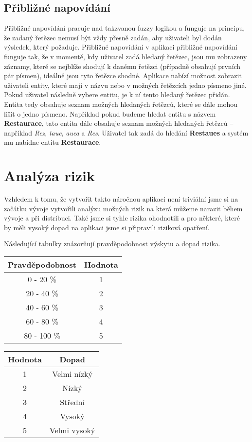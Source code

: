 \subsection{Přibližné napovídání}
\par Přibližné napovídání pracuje nad takzvanou fuzzy logikou a funguje na principu, že zadaný řetězec nemusí být vždy přesně zadán, aby uživateli byl dodán výsledek, který požaduje. Přibližné napovídání v aplikaci přibližné napovídání funguje tak, že v momentě, kdy uživatel zadá hledaný řetězec, jsou mu zobrazeny záznamy, které se nejblíže shodují k danému řetězci (případně obsahují prvních pár písmen), ideálně jsou tyto řetězce shodné. Aplikace nabízí možnost zobrazit uživateli entity, které mají v názvu nebo v možných řetězcích jedno písmeno jiné. Pokud uživatel následně vybere entitu, je k ní tento hledaný řetězec přidán. Entita tedy obsahuje seznam možných hledaných řetězců, které se dále mohou lišit o jedno písmeno. Například pokud budeme hledat entitu s názvem \textbf{Restaurace}, tato entita dále obsahuje seznam možných hledaných řetězců -- například \textit{Rez}, \textit{taue}, \textit{auea} a \textit{Res}. Uživatel tak zadá do hledání \textbf{Restaues} a systém mu nabídne entitu \textbf{Restaurace}.

\section{Analýza rizik}
\par Vzhledem k tomu, že vytvořit takto náročnou aplikaci není triviální jsme si na začátku vývoje vytvořili analýzu možných rizik na která můžeme narazit během vývoje a při distribuci. Také jsme si tyhle rizika ohodnotili a pro některé, které by měli vysoký dopad na aplikaci jsme si připravili riziková opatření.

\par Následující tabulky znázorňují pravděpodobnost výskytu a dopad rizika.

\begin{tabular}{|c | c |}
\hline
Pravděpodobnost&Hodnota\\
\hline
0 - 20 \%&1\\
\hline
20 - 40 \%&2\\
\hline
40 - 60 \%&3\\
\hline
60 - 80 \%&4\\
\hline
80 - 100 \%&5\\
\hline
\end{tabular}
\qquad\qquad\qquad\qquad
\begin{tabular}{|c | c |}
\hline
Hodnota&Dopad\\
\hline
1&Velmi nízký\\
\hline
2&Nízký\\
\hline
3&Střední\\
\hline
4&Vysoký\\
\hline
5&Velmi vysoký\\
\hline
\end{tabular}

